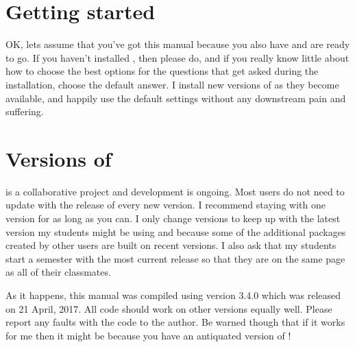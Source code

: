 \section{Getting started} 
 
OK, lets assume that you've got this manual because you also have \R{} and are ready to go. If you haven't installed \R{}, then please do, and if you really know little about how to choose the best options for the questions that get asked during the installation, choose the default answer. I install new versions of \R{} as they become available, and happily use the default settings without any downstream pain and suffering. 
 
\section{Versions of \R{}} 
 
\R{} is a collaborative project and development is ongoing. Most users do not need to update \R{} with the release of every new version. I recommend staying with one \R{} version for as long as you can. I only change versions to keep up with the latest version my students might be using and because some of the additional packages created by other \R{} users are built on recent versions.  I also ask that my students start a semester with the most current release so that they are on the same page as all of their classmates.

 
As it happens, this manual was compiled using version 3.4.0 which was released on 21 April, 2017. All code should work on other versions equally well. Please report any faults with the code to the author. Be warned though that if it works for me then it might be because you have an antiquated version of \R{}! 
 


